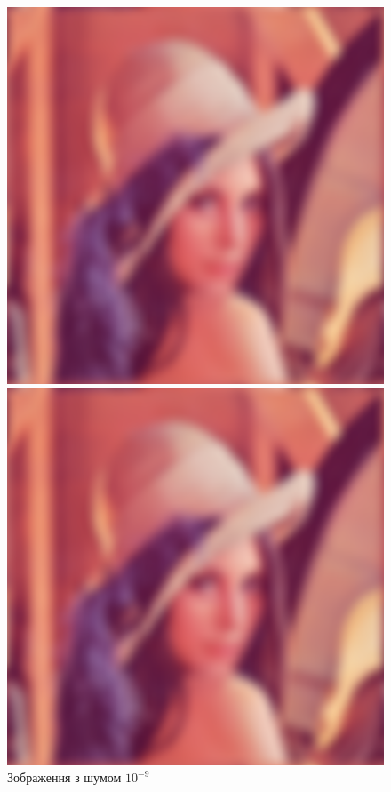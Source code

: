 \documentclass{diploma}
\begin{document}
\begin{figure}[htb]
          \includegraphics[width=\linewidth]{Lenna-b1e-9.png}
          \caption{Зображення з шумом $10^{-9}$}\label{fig:Lenna-b1e-9}
        \endminipage\hfill
          \includegraphics[width=\linewidth]{Lenna-b5e-9.png}

\end{figure}
\end{document}

